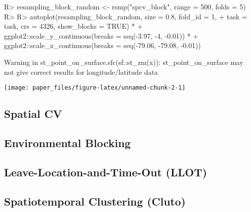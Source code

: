 \documentclass[
]{jss}
\begin{document}
\begin{CodeChunk}
\begin{CodeInput}
R> resampling_block_random <- rsmp("spcv_block", range = 500, folds = 5)
R> 
R> autoplot(resampling_block_random, size = 0.8, fold_id = 1,
+          task = task, crs = 4326, show_blocks = TRUE) *
+   ggplot2::scale_y_continuous(breaks = seq(-3.97, -4, -0.01)) *
+   ggplot2::scale_x_continuous(breaks = seq(-79.06, -79.08, -0.01))
\end{CodeInput}
\begin{CodeOutput}
Warning in st_point_on_surface.sfc(sf::st_zm(x)): st_point_on_surface may not
give correct results for longitude/latitude data
\end{CodeOutput}


\begin{center}\texttt{[image: paper\_files/figure-latex/unnamed-chunk-2-1]} \end{center}

\end{CodeChunk}

\hypertarget{spatial-cv}{%
\subsection{Spatial CV}\label{spatial-cv}}

\hypertarget{environmental-blocking}{%
\subsection{Environmental Blocking}\label{environmental-blocking}}

\hypertarget{leave-location-and-time-out-llot}{%
\subsection{Leave-Location-and-Time-Out
(LLOT)}\label{leave-location-and-time-out-llot}}

\hypertarget{spatiotemporal-clustering-cluto}{%
\subsection{Spatiotemporal Clustering
(Cluto)}\label{spatiotemporal-clustering-cluto}}
\end{document}
